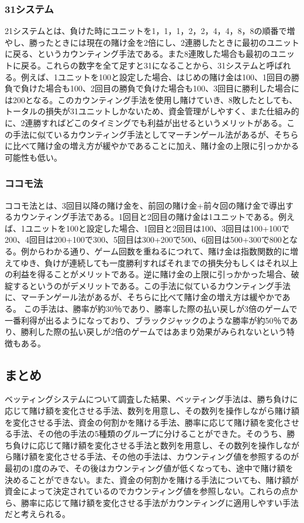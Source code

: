 \subsubsection{31システム}
21システムとは、負けた時にユニットを1，1，1，2，2，4，4，8，8の順番で増やし、勝ったときには現在の賭け金を2倍にし、2連勝したときに最初のユニットに戻る、というカウンティング手法である。また8連敗した場合も最初のユニットに戻る。これらの数字を全て足すと31になることから、31システムと呼ばれる。例えば、1ユニットを100と設定した場合、はじめの賭け金は100、1回目の勝負で負けた場合も100、2回目の勝負で負けた場合も100、3回目に勝利した場合には200となる。このカウンティング手法を使用し賭けていき、8敗したとしても、トータルの損失が31ユニットしかないため、資金管理がしやすく、また仕組み的に、2連勝すればどこのタイミングでも利益が出せるというメリットがある。この手法に似ているカウンティング手法としてマーチンゲール法があるが、そちらに比べて賭け金の増え方が緩やかであることに加え、賭け金の上限に引っかかる可能性も低い。
\subsubsection{ココモ法}
ココモ法とは、3回目以降の賭け金を、前回の賭け金+前々回の賭け金で導出するカウンティング手法である。1回目と2回目の賭け金は1ユニットである。例えば、1ユニットを100と設定した場合、1回目と2回目は100、3回目は100+100で200、4回目は200+100で300、5回目は300+200で500、6回目は500+300で800となる。例からわかる通り、ゲーム回数を重ねるにつれて、賭け金は指数関数的に増えてゆき、負けが連続しても一度勝利すればそれまでの損失分もしくはそれ以上の利益を得ることがメリットである。逆に賭け金の上限に引っかかった場合、破綻するというのがデメリットである。この手法に似ているカウンティング手法に、マーチンゲール法があるが、そちらに比べて賭け金の増え方は緩やかである。
この手法は、勝率が約30％であり、勝率した際の払い戻しが3倍のゲームで一番利得が出るようになっており、ブラックジャックのような勝率が約50％であり、勝利した際の払い戻しが2倍のゲームではあまり効果がみられないという特徴もある。

\subsection{まとめ}
ベッティングシステムについて調査した結果、ベッティング手法は、勝ち負けに応じて賭け額を変化させる手法、数列を用意し、その数列を操作しながら賭け額を変化させる手法、資金の何割かを賭ける手法、勝率に応じて賭け額を変化させる手法、その他の手法の5種類のグループに分けることができた。そのうち、勝ち負けに応じて賭け額を変化させる手法と数列を用意し、その数列を操作しながら賭け額を変化させる手法、その他の手法は、カウンティング値を参照するのが最初の1度のみで、その後はカウンティング値が低くなっても、途中で賭け額を決めることができない。また、資金の何割かを賭ける手法についても、賭け額が資金によって決定されているのでカウンティング値を参照しない。これらの点から、勝率に応じて賭け額を変化させる手法がカウンティングに適用しやすい手法だと考えられる。
